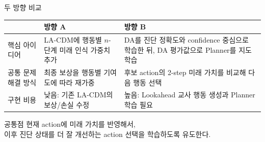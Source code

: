 \documentclass[
11pt,notheorems,hyperref={pdfauthor=whatever}
]{beamer}
\begin{document}
\begin{frame}{두 방향 비교}
\vspace{0.1em}
\begin{center}
\scriptsize
\begin{tabular}{p{}p{}p{}}
\toprule
 & \textbf{방향 A} & \textbf{방향 B} \\
\midrule
핵심 아이디어 &
LA-CDM에 행동별 \(n\)-단계 미래 인식 가중치 추가 &
DA를 진단 정확도와 confidence 중심으로 학습한 뒤, DA 평가값으로 Planner를 지도학습 \\
\addlinespace
공통 문제 해결 방식 &
최종 보상을 행동별 기여도에 따라 재가중 &
후보 action의 2-step 미래 가치를 비교해 다음 행동 선택 \\
\addlinespace
구현 비용 &
낮음: 기존 LA-CDM의 보상/손실 수정 &
높음: Lookahead 교사 행동 생성과 Planner 학습 필요 \\
\bottomrule
\end{tabular}
\end{center}

\vspace{0.35em}
\begin{block}{공통점}
\centering
\large
현재 action에 미래 가치를 반영해서,\\
이후 진단 상태를 더 잘 개선하는 action 선택을 학습하도록 유도한다.
\end{block}
\end{frame}
\end{document}
